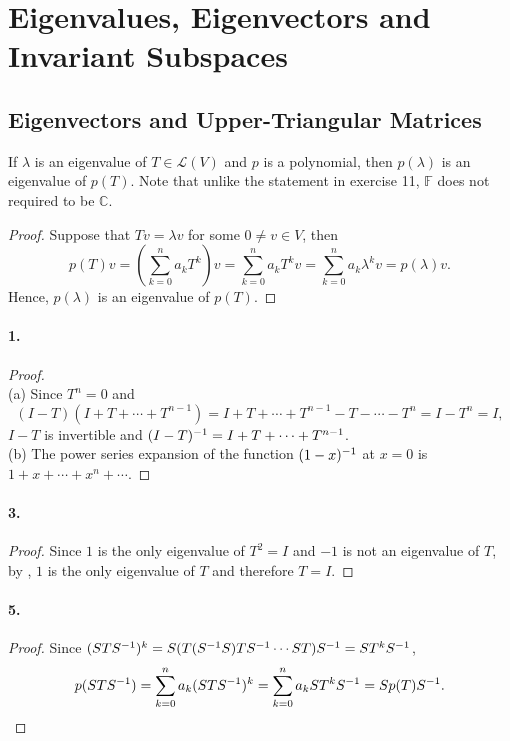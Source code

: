 \section{Eigenvalues, Eigenvectors and Invariant Subspaces}
\setcounter{subsection}{1}

\subsection{Eigenvectors and Upper-Triangular Matrices}
  \begin{lemma}
    \label{lemma:eigenvalue,polynomial}
    If $\lambda$ is an eigenvalue of $T\in\mathcal{L}(V)$ and $p$ is a 
    polynomial, then $p(\lambda)$ is an eigenvalue of $p(T)$. Note that unlike
    the statement in exercise 11, $\mathbb{F}$ does not required to be 
    $\mathbb{C}$.
  \end{lemma}
  \begin{proof}
    Suppose that $Tv=\lambda v$ for some $0\ne v\in V$, then
    \[
      p(T)v = \left(\sum_{k=0}^n a_kT^k \right)v =
      \sum_{k=0}^n a_kT^kv = \sum_{k=0}^n a_k\lambda^k v = p(\lambda)v.
    \]
    Hence, $p(\lambda)$ is an eigenvalue of $p(T)$.
  \end{proof}

  \paragraph{1.}
  \begin{proof}
    $\,$\\
    (a) Since $T^n=0$ and 
    \[
      (I-T)(I+T+\cdots+T^{n-1}) = I+T+\cdots+T^{n-1} - T-\cdots-T^n
      = I - T^n = I,
    \]
    $I-T$ is invertible and $(I-T)^{-1}=I+T+\cdots+T^{n-1}$. \\
    (b) The power series expansion of the function $(1-x)^{-1}$ at $x=0$ is
    $1 + x + \cdots + x^n + \cdots$. 
  \end{proof}

  \paragraph{3.}
  \begin{proof}
    Since $1$ is the only eigenvalue of $T^2=I$ and $-1$ is not an eigenvalue of
    $T$, by , $1$ is the only eigenvalue 
    of $T$ and therefore $T=I$.
  \end{proof}

  \paragraph{5.}
  \begin{proof}
    Since $(STS^{-1})^k = S(T(S^{-1} S)TS^{-1}\cdots ST)S^{-1} = ST^kS^{-1}$,
    \[
      p(STS^{-1}) = \sum_{k=0}^n a_k(STS^{-1})^k = \sum_{k=0}^n a_kST^kS^{-1} 
      = Sp(T)S^{-1}.
    \]
  \end{proof}

